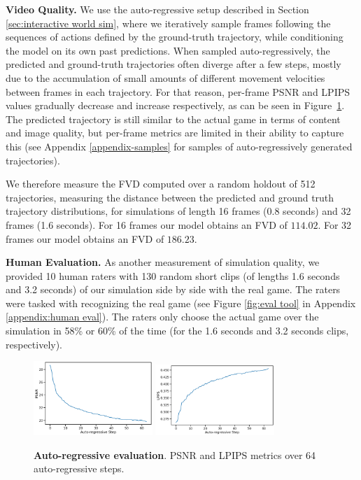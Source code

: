 \documentclass{article} %
\begin{document}
\textbf{Video Quality.} We use the auto-regressive setup described in Section \ref{sec:interactive world sim}, where we iteratively sample frames following the sequences of actions defined by the ground-truth trajectory, while conditioning the model on its own past predictions. When sampled auto-regressively, the predicted and ground-truth trajectories often diverge after a few steps, mostly due to the accumulation of small amounts of different movement velocities between frames in each trajectory. For that reason, per-frame PSNR and LPIPS values gradually decrease and increase respectively, as can be seen in Figure~\ref{fig:ar_eval}. The predicted trajectory is still similar to the actual game in terms of content and image quality, but per-frame metrics are limited in their ability to capture this (see Appendix \ref{appendix-samples} for samples of auto-regressively generated trajectories).

We therefore measure the FVD \citep{UnterthinerSKMM19FVD} computed over a random holdout of 512 trajectories, measuring the distance between the predicted and ground truth trajectory distributions, for simulations of length 16 frames (0.8 seconds) and 32 frames (1.6 seconds). For 16 frames our model obtains an FVD of $114.02$. For 32 frames our model obtains an FVD of $186.23$.

\textbf{Human Evaluation.} As another measurement of simulation quality, we provided 10 human raters with 130 random short clips (of lengths 1.6 seconds and 3.2 seconds) of our simulation side by side with the real game. The raters were tasked with recognizing the real game (see Figure \ref{fig:eval tool} in Appendix \ref{appendix:human eval}). The raters only choose the actual game over the simulation in 58\% or 60\% of the time (for the 1.6 seconds and 3.2 seconds clips, respectively).

\begin{figure}[t]
    \centering
    \includegraphics[width=0.4\textwidth]{figures/psnr_step_700k_08212004.png}
    \includegraphics[width=0.4\textwidth]{figures/lpips_step_700k_08212004.png}
    \caption{\textbf{Auto-regressive evaluation}. PSNR and LPIPS metrics over 64 auto-regressive steps.}
    \label{fig:ar_eval}
\end{figure}
\end{document}
